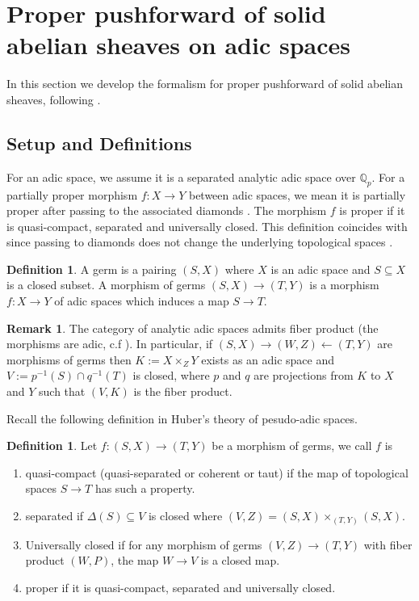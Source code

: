 \documentclass{article}
\theoremstyle{definition}
\newtheorem{definition}[theorem]{Definition}
\newtheorem{remark}[theorem]{Remark}
\def\bbQ{\mathbb{Q}}
\begin{document}
\appendix

\section{Proper pushforward of solid abelian sheaves on adic spaces}\label{section:properpushforward}
In this section we develop the formalism for proper pushforward of solid abelian sheaves, following \cite{abe2020proper}.
\subsection{Setup and Definitions}
For an adic space, we assume it is a separated analytic adic space over $\bbQ_p$. For a partially proper morphism $f:X\to Y$ between adic spaces, we mean it is partially proper after passing to the associated diamonds \cite[Definition. 18.4]{scholze2022etale}. The morphism $f$ is proper if it is quasi-compact, separated and universally closed. This definition coincides with \cite[Definition. 18.1]{scholze2022etale} since passing to diamonds does not change the underlying topological spaces \cite[Lemma. 15.6]{scholze2022etale}.

\begin{definition}
	A germ is a pairing $(S,X)$ where $X$ is an adic space and $S\subseteq X$ is a closed subset. A morphism of germs $(S,X)\to (T,Y)$ is a morphism $f:X\to Y$ of adic spaces which induces a map $S\to T$.
\end{definition}

\begin{remark}
	The category of analytic adic spaces admits fiber product (the morphisms are adic, c.f \cite[Proposition 5.1.5]{scholze2020berkeley}). In particular, if $(S,X)\longrightarrow (W,Z)\longleftarrow (T,Y)$ are morphisms of germs then $K:=X\times_Z Y$ exists as an adic space and $V:=p^{-1}(S)\cap q^{-1}(T)$ is closed, where $p$ and $q$ are projections from $K$ to $X$ and $Y$ such that $(V,K)$ is the fiber product.
\end{remark}

Recall the following definition in Huber's theory of pesudo-adic spaces.

\begin{definition}
Let $f:(S,X)\to (T,Y)$ be a morphism of germs, we call $f$ is
	\begin{enumerate}
		\item quasi-compact (quasi-separated or coherent or taut) if the map of topological spaces $S\to T$ has such a property.
		\item separated if $\Delta(S)\subseteq V$ is closed where $(V,Z)=(S,X)\times_{(T,Y)}(S,X)$.
		\item Universally closed if for any morphism of germs $(V,Z)\to (T,Y)$ with fiber product $(W,P)$, the map $W\to V$ is a closed map.
		\item proper if it is quasi-compact, separated and universally closed.
	\end{enumerate}
\end{definition}
\end{document}
